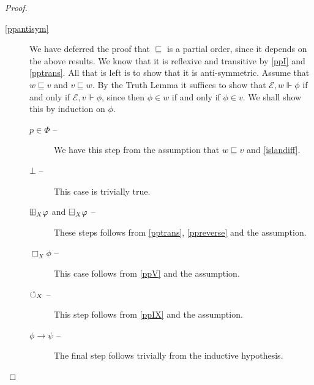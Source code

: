 \begin{proof}
\begin{description}
     \item[\ref{ppantisym}] We have deferred the proof that
      $\sqsubseteq$ is a partial order, since it depends on the above
      results.  We know that it is reflexive and transitive by
      \ref{ppI} and \ref{pptrans}.  All that is left is to show that
      it is anti-symmetric.  Assume that $w \sqsubseteq v$ and $v
      \sqsubseteq w$.  By the Truth Lemma it suffices to show that
      $\mathscr{E}, w \Vdash \phi$ if and only if $\mathscr{E}, v
      \Vdash \phi$, since then $\phi \in w$ if and only if $\phi \in v$.  We shall show this by induction on $\phi$.
      \begin{description}
        \item[$p \in \Phi$ --]  We have this step from the assumption
          that $w \sqsubseteq v$ and \ref{islandiff}.
        \item[$\bot$ --]  This case is trivially true.
        \item[$\boxplus_X \varphi$ and $\boxminus_X\varphi$ --]  These steps follows from
          \ref{pptrans}, \ref{ppreverse} and the assumption.
        \item[$\Box_X \phi$ --]  This case follows from \ref{ppV} and
          the assumption.
        \item[$\circlearrowleft_X$ --] This step follows from \ref{ppIX} and the assumption.
        \item[$\phi \to \psi$ --]  The final step follows trivially from the inductive hypothesis.
      \end{description}






\end{description}
\end{proof}
